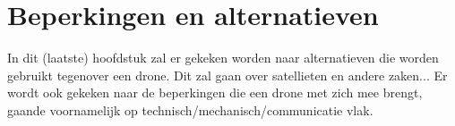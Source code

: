 \chapter{Beperkingen en alternatieven}
In dit (laatste) hoofdstuk zal er gekeken worden naar alternatieven die worden gebruikt tegenover een drone. Dit zal gaan over satellieten en andere zaken... Er wordt ook gekeken naar de beperkingen die een drone met zich mee brengt, gaande voornamelijk op technisch/mechanisch/communicatie vlak. 
